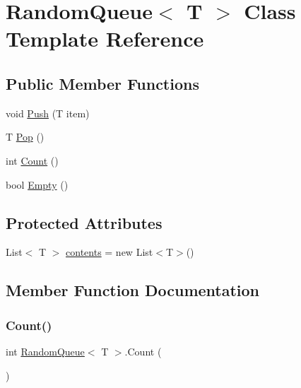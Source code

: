 \hypertarget{class_random_queue}{}\section{Random\+Queue$<$ T $>$ Class Template Reference}
\label{class_random_queue}
\subsection*{Public Member Functions}
\begin{DoxyCompactItemize}
\item 
void \mbox{\hyperlink{class_random_queue_a9b04768a955285d6df22824f12874958}{Push}} (T item)
\item 
T \mbox{\hyperlink{class_random_queue_a15fed32fe3e55df6f1fe883e019525f1}{Pop}} ()
\item 
int \mbox{\hyperlink{class_random_queue_a711ffc77868ff152cb4f407b1f0cb8f8}{Count}} ()
\item 
bool \mbox{\hyperlink{class_random_queue_af19660c14e19e166a4632a37cba1a8c1}{Empty}} ()
\end{DoxyCompactItemize}
\subsection*{Protected Attributes}
\begin{DoxyCompactItemize}
\item 
List$<$ T $>$ \mbox{\hyperlink{class_random_queue_a33495067868e22aa274248df60013b11}{contents}} = new List$<$T$>$()
\end{DoxyCompactItemize}


\subsection{Member Function Documentation}
\mbox{\label{class_random_queue_a711ffc77868ff152cb4f407b1f0cb8f8}} 
\subsubsection{\texorpdfstring{Count()}{Count()}}
{\footnotesize\ttfamily int \mbox{\hyperlink{class_random_queue}{Random\+Queue}}$<$ T $>$.Count (\begin{DoxyParamCaption}{ }\end{DoxyParamCaption})}

